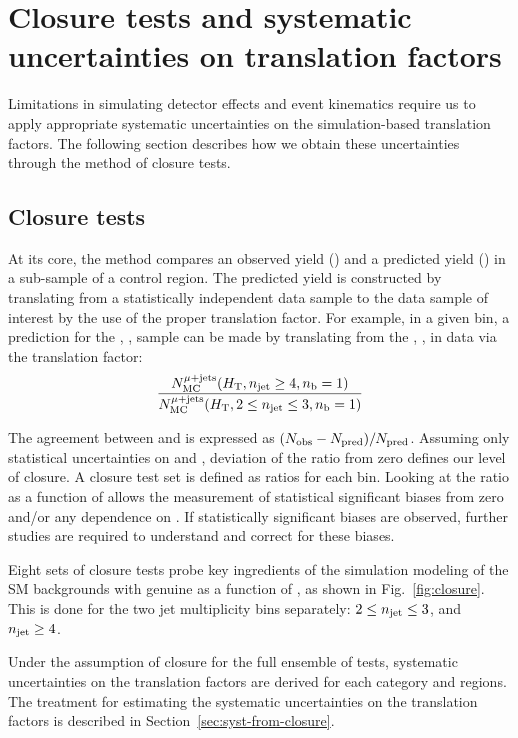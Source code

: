 \clearpage
\section{Closure tests and systematic uncertainties on translation factors\label{sec:bkgd-syst}}

Limitations in simulating detector effects and event kinematics 
require us to apply appropriate systematic uncertainties 
on the simulation-based translation factors. The following section 
describes how we obtain these uncertainties through the method of closure tests.

\subsection{Closure tests\label{sec:closure-tests-desc}}

At its core, the method compares an observed yield (\nobs) and a predicted
yield (\npre) in a sub-sample of a control region.  The predicted yield is constructed
by translating from a statistically independent data sample to the data sample of
interest by the use of the proper translation factor.  For example, in a given \scalht bin,
a prediction for the \njethigh, , \mj sample can be made by translating from the
\njetlow, , \mj in data via the translation factor: 
\begin{equation}
  \label{equ:tf-ratio-closure}
  \frac{N_{\rm MC}^{\rm \mu + jets}(\mbox{$H_\text{T}$},n_{\text{jet}} \geq 4, n_{\text{b}}=1)}{N_{\rm MC}^{\rm \mu + jets}(\mbox{$H_\text{T}$},2 \leq n_{\text{jet}} \leq 3,n_{\text{b}}=1)} 
\end{equation}

The agreement between \nobs and \npre is expressed as $(N_{\textrm{obs}} - N_{\textrm{pred}})/N_{\textrm{pred}}$.
Assuming only statistical uncertainties on \nobs and \npre, deviation of the 
ratio from zero defines our level of closure. A closure test set is defined
as ratios for each \scalht bin. Looking at the ratio as a function
of \scalht allows the measurement of statistical significant biases from zero and/or 
any dependence on \scalht.  If statistically significant biases
are observed, further studies are required to understand and correct
for these biases.

Eight sets of closure tests probe key ingredients of the simulation modeling 
of the SM backgrounds with genuine \met as a function of \scalht, as shown in
Fig.~\ref{fig:closure}. This is done for the two jet multiplicity bins
separately: $2 \leq n_{\text{jet}} \leq 3$, and $n_{\text{jet}} \geq 4$.

Under the assumption of closure for the full ensemble of tests,
systematic uncertainties on the translation factors are derived for each
\njet category and \scalht regions. The treatment for
estimating the systematic uncertainties on the translation factors is
described in Section~\ref{sec:syst-from-closure}.

